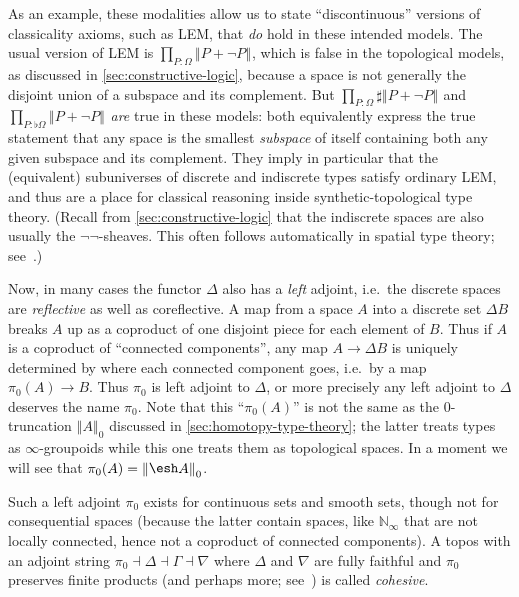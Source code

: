 \documentclass[10pt]{article}
\def\oo{\ensuremath{\infty}}
\def\N{\mathbb{N}}
\numberwithin{equation}{section}
\newcommand{\trunc}[2]{\mathopen{}\left\Vert #2\right\Vert_{#1}\mathclose{}}
\newcommand{\brck}[1]{\trunc{}{#1}}
\newcommand{\shape}{\ensuremath{\mathord{\raisebox{0.5pt}{\text{\rm\esh}}}}}
\begin{document}
As an example, these modalities allow us to state ``discontinuous'' versions of classicality axioms, such as LEM, that \emph{do} hold in these intended models.
The usual version of LEM is $\prod_{P:\Omega} \brck{P + \neg P}$, which is false in the topological models, as discussed in \cref{sec:constructive-logic}, because a space is not generally the disjoint union of a subspace and its complement.
But $\prod_{P:\Omega} \sharp\brck{P + \neg P}$ and $\prod_{P:\flat\Omega} \brck{P + \neg P}$ \emph{are} true in these models: both equivalently express the true statement that any space is the smallest \emph{subspace} of itself containing both any given subspace and its complement.
They imply in particular that the (equivalent) subuniverses of discrete and indiscrete types satisfy ordinary LEM, and thus are a place for classical reasoning inside synthetic-topological type theory.
(Recall from \cref{sec:constructive-logic} that the indiscrete spaces are also usually the $\neg\neg$-sheaves.
This often follows automatically in spatial type theory; see~\cite{shulman:bfp-realcohesion}.)

Now, in many cases the functor $\Delta$ also has a \emph{left} adjoint, i.e.\ the discrete spaces are \emph{reflective} as well as coreflective.
A map from a space $A$ into a discrete set $\Delta B$ breaks $A$ up as a coproduct of one disjoint piece for each element of $B$.
Thus if $A$ is a coproduct of ``connected components'', any map $A\to \Delta B$ is uniquely determined by where each connected component goes, i.e.\ by a map $\pi_0(A)\to B$.
Thus $\pi_0$ is left adjoint to $\Delta$, or more precisely any left adjoint to $\Delta$ deserves the name $\pi_0$.
Note that this ``$\pi_0(A)$'' is not the same as the $0$-truncation $\trunc 0 A$ discussed in \cref{sec:homotopy-type-theory}; the latter treats types as \oo-groupoids while this one treats them as topological spaces.
In a moment we will see that $\pi_0(A) = \trunc 0{\shape A}$.

Such a left adjoint $\pi_0$ exists for continuous sets and smooth sets, though not for consequential spaces (because the latter contain spaces, like $\N_\oo$ that are not locally connected, hence not a coproduct of connected components).
A topos with an adjoint string $\pi_0\dashv \Delta\dashv \Gamma\dashv \nabla$ where $\Delta$ and $\nabla$ are fully faithful and $\pi_0$ preserves finite products (and perhaps more; see~\cite{lawvere:cohesion,johnstone:punctual-lc,shulman:bfp-realcohesion}) is called \emph{cohesive}.
\end{document}
